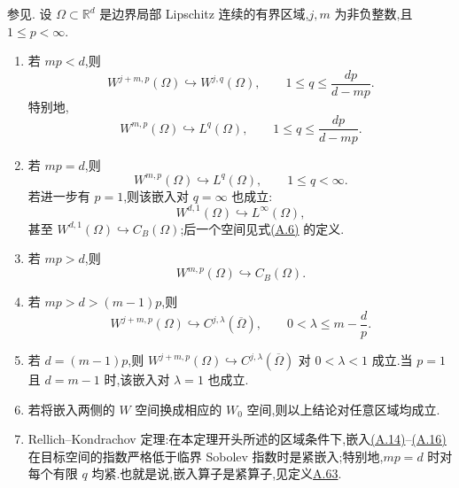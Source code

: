 \begin{theorem}\label{thm:appendix-a-42}
参见\textcite[定理 5.4、注 5.5(6) 与定理 6.2]{Adams1975}.
设 $\Omega\subset\mathbb R^d$ 是边界局部 Lipschitz 连续的有界区域,$j,m$ 为非负整数,且 $1\le p<\infty$.
\begin{enumerate}[label=(\roman*)]
 \item 若 $mp<d$,则
 \begin{equation}\label{eq:appendix-a-14}
 W^{j+m,p}(\Omega)\hookrightarrow W^{j,q}(\Omega),
 \qquad 1\le q\le\frac{dp}{d-mp}.
 \end{equation}
 特别地,
 \begin{equation}\label{eq:appendix-a-15}
 W^{m,p}(\Omega)\hookrightarrow L^q(\Omega),
 \qquad 1\le q\le\frac{dp}{d-mp}.
 \end{equation}
 \item 若 $mp=d$,则
 \begin{equation}\label{eq:appendix-a-16}
 W^{m,p}(\Omega)\hookrightarrow L^q(\Omega),
 \qquad 1\le q<\infty.
 \end{equation}
 若进一步有 $p=1$,则该嵌入对 $q=\infty$ 也成立:
 \begin{equation}\label{eq:appendix-a-17}
 W^{d,1}(\Omega)\hookrightarrow L^\infty(\Omega),
 \end{equation}
 甚至 $W^{d,1}(\Omega)\hookrightarrow C_B(\Omega)$;后一个空间见式\hyperref[eq:appendix-a-6]{(A.6)} 的定义.
 \item 若 $mp>d$,则
 \begin{equation}\label{eq:appendix-a-18}
 W^{m,p}(\Omega)\hookrightarrow C_B(\Omega).
 \end{equation}
 \item 若 $mp>d>(m-1)p$,则
 \begin{equation}\label{eq:appendix-a-19}
 W^{j+m,p}(\Omega)\hookrightarrow C^{j,\lambda}(\overline\Omega),
 \qquad 0<\lambda\le m-\frac{d}{p}.
 \end{equation}
 \item 若 $d=(m-1)p$,则 $W^{j+m,p}(\Omega)\hookrightarrow C^{j,\lambda}(\overline\Omega)$ 对 $0<\lambda<1$ 成立.当 $p=1$ 且 $d=m-1$ 时,该嵌入对 $\lambda=1$ 也成立.
 \item 若将嵌入两侧的 $W$ 空间换成相应的 $W_0$ 空间,则以上结论对任意区域均成立.
 \item Rellich--Kondrachov 定理:在本定理开头所述的区域条件下,嵌入\hyperref[eq:appendix-a-14]{(A.14)}--\hyperref[eq:appendix-a-16]{(A.16)} 在目标空间的指数严格低于临界 Sobolev 指数时是紧嵌入;特别地,$mp=d$ 时对每个有限 $q$ 均紧.也就是说,嵌入算子是紧算子,见定义\hyperref[def:appendix-a-63]{A.63}.
\end{enumerate}
\end{theorem}

